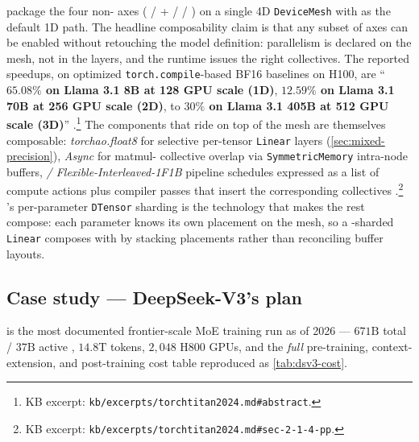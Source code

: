 \citet{torchtitan2024} package the four non- axes ( / + /  /
) on a single 4D \texttt{DeviceMesh} with  as the default
1D path. The headline composability claim is that any subset of axes
can be enabled without retouching the model definition: parallelism is
declared on the mesh, not in the layers, and the runtime issues the
right collectives. The reported speedups, on optimized
\texttt{torch.compile}-based BF16 baselines on H100, are
``\textbf{$65.08\%$ on Llama 3.1 8B at 128 GPU scale (1D)},
\textbf{$12.59\%$ on Llama 3.1 70B at 256 GPU scale (2D)}, to
\textbf{$30\%$ on Llama 3.1 405B at 512 GPU scale (3D)}''
\citep[abstract]{torchtitan2024}.\footnote{KB excerpt:
\nolinkurl{kb/excerpts/torchtitan2024.md#abstract}.} The components that
ride on top of the mesh are themselves composable:
\emph{torchao.float8} for selective per-tensor  \texttt{Linear}
layers (\cref{sec:mixed-precision}), \emph{Async } for matmul-
collective overlap via \texttt{SymmetricMemory} intra-node buffers,
\emph{ / Flexible-Interleaved-1F1B} pipeline schedules
expressed as a list of compute actions plus compiler passes that insert
the corresponding collectives \citep[\S 2.1.4]{torchtitan2024}.\footnote{KB
excerpt: \nolinkurl{kb/excerpts/torchtitan2024.md#sec-2-1-4-pp}.}
's per-parameter \texttt{DTensor} sharding is the technology that
makes the rest compose: each parameter knows its own placement on the
mesh, so a -sharded \texttt{Linear} composes with  by stacking
placements rather than reconciling buffer layouts. 

\subsection{Case study --- DeepSeek-V3's plan}
\label{sec:dt-deepseek}

 \citep{deepseek-v3} is the most documented frontier-scale
MoE training run as of 2026 --- $671\text{B}$ total / $37\text{B}$
active , $14.8\text{T}$ tokens, $2{,}048$ H800 GPUs, and the
\emph{full} pre-training, context-extension, and post-training cost
table reproduced as \cref{tab:dsv3-cost}.


